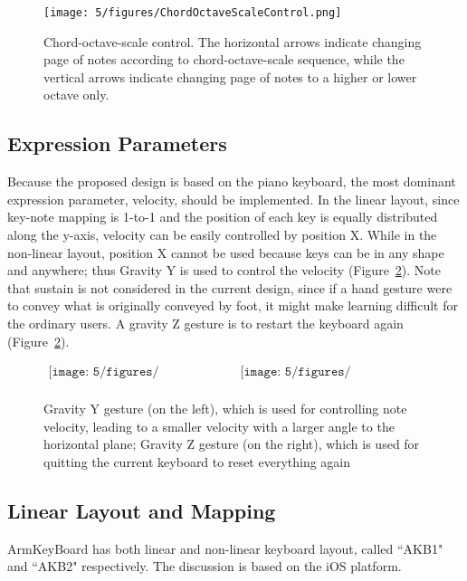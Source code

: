 \begin{figure}[htbp]
\centering
\texttt{[image: 5/figures/ChordOctaveScaleControl.png]}
\caption{Chord-octave-scale control. The horizontal arrows indicate changing page of notes according to chord-octave-scale sequence, while the vertical arrows indicate changing page of notes to a higher or lower octave only.}
\label{figChordOctaveScaleControl}
\end{figure}

\subsection{Expression Parameters}
Because the proposed design is based on the piano keyboard, the most dominant expression parameter, velocity, should be implemented. In the
linear layout, since key-note mapping is 1-to-1 and the position of each key is equally distributed along the y-axis, velocity can be easily controlled by position X. While in the non-linear layout, position X cannot be used because keys can be in any shape and anywhere; thus Gravity Y is used to control the velocity (Figure~\ref{fig:5-GravityYZGesture}). Note that sustain is not considered in the current design, since if a hand gesture were to convey what is originally conveyed by foot, it might make learning difficult for the ordinary users. A gravity Z gesture is to restart the keyboard again (Figure~\ref{fig:5-GravityYZGesture}).
\begin{figure}[htbp]
\begin{center}$
\begin{array}{cc}
\texttt{[image: 5/figures/GravityY.jpg]} &
\texttt{[image: 5/figures/GravityZ.jpg]} \\
\end{array}$
\end{center}
\caption{Gravity Y gesture (on the left), which is used for controlling note velocity, leading to a smaller velocity with a larger angle to the horizontal plane; Gravity Z gesture (on the right), which is used for quitting the current keyboard to reset everything again}
\label{fig:5-GravityYZGesture}
\end{figure}

\subsection{Linear Layout and Mapping}
ArmKeyBoard has both linear and non-linear keyboard layout, called ``AKB1" and ``AKB2" respectively. The discussion is based on the iOS platform.

